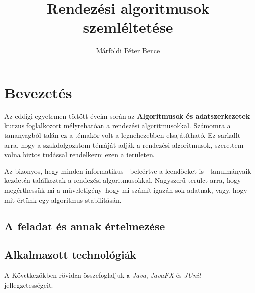 \documentclass{elteikthesis}
\title{Rendezési algoritmusok szemléltetése}
\author{Márföldi Péter Bence}
\begin{document}
\frontmatter

	\maketitle
	\renewcommand{\thepage}{\Roman{page}}
	\tableofcontents\thispagestyle{fancy}
	
\mainmatter
	\pagestyle{fancy}

\chapter{Bevezetés} 
 Az eddigi egyetemen töltött éveim során az \textbf{Algoritmusok és adatszerkezetek} kurzus foglalkozott mélyrehatóan a rendezési algoritmusokkal. Számomra a tananyagból talán ez a témakör volt a legnehezebben elsajátítható. Ez sarkallt arra, hogy a szakdolgozatom témáját adják a rendezési algoritmusok, szerettem volna biztos tudással rendelkezni ezen a területen.\par
 Az bizonyos, hogy minden informatikus - beleértve a leendőeket is - tanulmányaik kezdetén találkoztak a rendezési algoritmusokkal. Nagyszerű terület arra, hogy megérthessük mi a műveletigény, hogy mi számít igazán sok adatnak, vagy, hogy mit értünk egy algoritmus stabilitásán.\par

\section{A feladat és annak értelmezése} 

\section{Alkalmazott technológiák}
A Következőkben röviden összefoglaljuk a \emph{Java}\cite{Java}, \emph{JavaFX}\cite{JavaFX} és \emph{JUnit}\cite{JUnit} jellegzetességeit.
\end{document}
